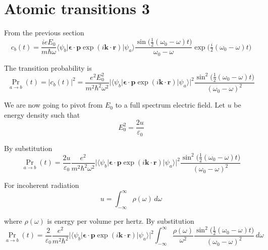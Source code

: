 

\section*{Atomic transitions 3}

From the previous section
\begin{equation*}
c_b(t)=\frac{ieE_0}{m\hbar\omega}
\langle\psi_b|\boldsymbol{\epsilon}\cdot\mathbf p\exp(i\mathbf k\cdot\mathbf r)|\psi_a\rangle
\frac{\sin\bigl(\tfrac{1}{2}(\omega_0-\omega)t\bigr)}{\omega_0-\omega}
\exp\bigl(\tfrac{i}{2}(\omega_0-\omega)t\bigr)
\end{equation*}

The transition probability is
\begin{equation*}
\Pr_{a\rightarrow b}(t)=|c_b(t)|^2
=\frac{e^2E_0^2}{m^2\hbar^2\omega^2}
\bigl|\langle\psi_b|\boldsymbol{\epsilon}\cdot\mathbf p\exp(i\mathbf k\cdot\mathbf r)|\psi_a\rangle\bigr|^2
\frac{\sin^2\bigl(\tfrac{1}{2}(\omega_0-\omega)t\bigr)}{(\omega_0-\omega)^2}
\end{equation*}

We are now going to pivot from $E_0$ to a full spectrum electric field.
Let $u$ be energy density such that
\begin{equation*}
E_0^2=\frac{2u}{\varepsilon_0}
\end{equation*}

By substitution
\begin{equation*}
\Pr_{a\rightarrow b}(t)
=\frac{2u}{\varepsilon_0}
\frac{e^2}{m^2\hbar^2\omega^2}
\bigl|\langle\psi_b|\boldsymbol{\epsilon}\cdot\mathbf p\exp(i\mathbf k\cdot\mathbf r)|\psi_a\rangle\bigr|^2
\frac{\sin^2\bigl(\tfrac{1}{2}(\omega_0-\omega)t\bigr)}{(\omega_0-\omega)^2}
\end{equation*}

For incoherent radiation
\begin{equation*}
u=\int_{-\infty}^\infty\rho(\omega)\,d\omega
\end{equation*}

where $\rho(\omega)$ is energy per volume per hertz.
By substitution
\begin{equation*}
\Pr_{a\rightarrow b}(t)
=\frac{2}{\varepsilon_0}
\frac{e^2}{m^2\hbar^2}
\bigl|\langle\psi_b|\boldsymbol{\epsilon}\cdot\mathbf p\exp(i\mathbf k\cdot\mathbf r)|\psi_a\rangle\bigr|^2
\int_{-\infty}^\infty\frac{\rho(\omega)}{\omega^2}
\frac{\sin^2\bigl(\tfrac{1}{2}(\omega_0-\omega)t\bigr)}{(\omega_0-\omega)^2}\,d\omega
\end{equation*}

